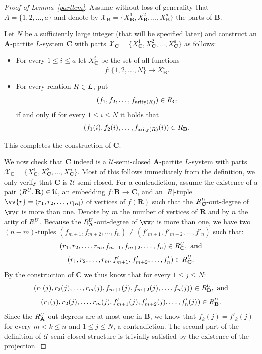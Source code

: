 \documentclass{elsarticle}
\def\str#1{\mathbf {#1}}
\def\arity#1{\mathop{\mathrm{arity}}\nolimits(\rel{}{#1})}
\def\nbrel#1#2{R\ifstrempty{#1}{}{_{#1}}\ifstrempty{#2}{}{^{#2}}}
\def\rel#1#2{\nbrel{\ifstrempty{#1}{}{\str{#1}}}{#2}}
\theoremstyle{plain}
\theoremstyle{definition}
\theoremstyle{remark}
\begin{document}
\begin{proof}[Proof of Lemma~\ref{partlem}]
Assume without loss of generality that $A = \{1, 2,\ldots, a\}$  and denote by $\mathcal X_\str{B} = \{X^1_\str{B},X^2_\str{B},\ldots, X^a_\str{B}\}$ the parts of $\str{B}$.

Let $N$ be a sufficiently large integer (that will be specified later) and construct an $\str{A}$-partite $L$-system  $\str{C}$
with parts $\mathcal X_\str{C} = \{X^1_\str{C},X^2_\str{C},\ldots, X^a_\str{C}\}$  as follows:
\begin{itemize}
\item For every $1\leq i\leq a$ let $X_\str{C}^i$ be the set of all functions $$f\colon \{1,2,\ldots,N\}\to X_\str{B}^i.$$
\item For every relation $\rel{}{}\in L$, put $$(f_1,f_2,\ldots, f_{\arity{}})\in \rel{C}{}$$ if and only if for every $1\leq i\leq N$ it holds that $$(f_1(i),f_2(i),\ldots, f_{\arity{}}(i))\in \rel{B}{}.$$
\end{itemize}
This completes the construction of $\str{C}$.

\medskip
We now check that $\str{C}$ indeed is  a $\mathcal U$-semi-closed $\str{A}$-partite $L$-system
with parts $\mathcal X_\str{C} = \{X^1_\str{C},\allowbreak X^2_\str{C},\allowbreak \ldots,\allowbreak  X^a_\str{C}\}$.
Most of this follows immediately from the definition,
we only verify that $\str{C}$ is $\mathcal U$-semi-closed.  For a contradiction, assume the existence of a pair $(\rel{}{U},\str{R})\in \mathcal U$, an embedding  $f\colon \str{R}\to \str{C}$, and an $|R|$-tuple $\vv{r}=(r_1,r_2,\ldots, r_{\vert R\vert })$ of vertices of $f(\str{R})$ such that the $\rel{C}{U}$-out-degree of $\vv r$ is more than one. Denote by $m$ the number of vertices of $\str{R}$ and by $n$ the arity of $\rel{}{U}$.  Because the $\rel{A}{U}$-out-degree of $\vv r$ is more than one, we have two $(n-m)$-tuples $(f_{m+1},f_{m+2},\ldots, f_{n}) \neq (f'_{m+1},f'_{m+2},\ldots, f'_{n})$ such that: 
$$(r_1,r_2,\ldots, r_m, f_{m+1},f_{m+2},\ldots, f_{n})\in \rel{C}{U},\hbox{ and}$$
$$(r_1,r_2,\ldots, r_m, f'_{m+1},f'_{m+2},\ldots, f'_{n})\in \rel{C}{U}.$$
By the construction of $\str{C}$ we thus know that for every $1\leq j\leq N$:
 $$(r_1(j),r_2(j),\ldots, r_m(j), f_{m+1}(j),f_{m+2}(j),\ldots, f_{n}(j))\in \rel{B}{U},\hbox{ and}$$
 $$(r_1(j),r_2(j),\ldots, r_m(j), f'_{m+1}(j),f'_{m+2}(j),\ldots, f'_{n}(j))\in \rel{B}{U}.$$
Since the $\rel{A}{U}$-out-degrees are at most one in $\str{B}$, we know that $f_k(j)=f'_k(j)$ for every $m < k\leq n$ and $1\leq j\leq N$, a contradiction.
The second part of the definition of $\mathcal U$-semi-closed structure is trivially satisfied by the existence of the projection.


\end{proof}
\end{document}
